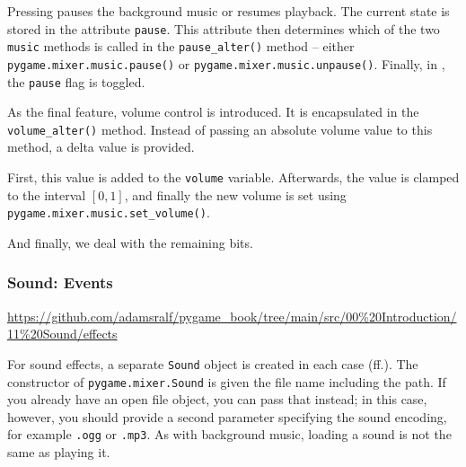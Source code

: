 
Pressing  pauses the background music or resumes playback. The current state is stored in the attribute \texttt{pause}. This attribute then determines which of the two \texttt{music} methods is called in the \texttt{pause\_alter()} method -- either  \texttt{pygame.mixer.music.pause()} or \texttt{pygame.mixer.music.unpause()}. Finally, in , the \texttt{pause} flag is toggled.


As the final feature, volume control is introduced. It is encapsulated in the \texttt{volume\-\_alter()} method. Instead of passing an absolute volume value to this method, a delta value is provided.

First, this value is added to the \texttt{volume} variable. Afterwards, the value is clamped to the interval $[0, 1]$, and finally the new volume is set using \texttt{pygame.mixer.music.set\-\_volume()}.


And finally, we deal with the remaining bits.


\subsubsection{Sound: Events}
\begin{diskbox}
	\url{https://github.com/adamsralf/pygame_book/tree/main/src/00%20Introduction/11%20Sound/effects}
\end{diskbox}

For sound effects, a separate \texttt{Sound} object is created in each case (ff.). The constructor of \texttt{pygame.mixer.Sound} is given the file name including the path. If you already have an open file object, you can pass that instead; in this case, however, you should provide a second parameter specifying the sound encoding, for example \texttt{.\gls{ogg}} or \texttt{.\gls{mp3}}. As with background music, loading a sound is not the same as playing it.

